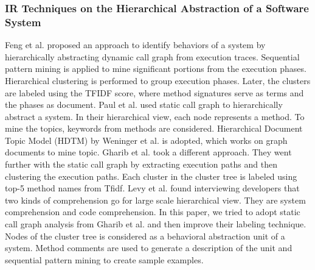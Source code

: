 \subsubsection{IR Techniques on the Hierarchical Abstraction of a Software System}
Feng et al. \cite{feng2018hierarchicalExecutionComprehension} proposed an approach to identify behaviors of a system by hierarchically abstracting dynamic call graph from execution traces. Sequential pattern mining is applied to mine significant portions from the execution phases. Hierarchical clustering is performed to group execution phases. Later, the clusters are labeled using the TFIDF score, where method signatures serve as terms and the phases as document. 
Paul et al. \cite{mcburney2014improvingTopicSummarize} used static call graph to hierarchically abstract a system. In their hierarchical view, each node represents a method. To mine the topics, keywords from methods are considered. Hierarchical Document Topic Model (HDTM) by \cite{weninger2012documentTopicHierarchies} Weninger et al. is adopted, which works on graph documents to mine topic. Gharib et al. \cite{gharibi2018automaticStaticCluster} took a different approach. They went further with the static call graph by extracting execution paths and then clustering the execution paths. Each cluster in the cluster tree is labeled using top-5 method names from Tfidf. Levy et al. \cite{levy2019understandingLargeHierarchical} found interviewing developers that two kinds of comprehension go for large scale hierarchical view. They are system comprehension and code comprehension. In this paper, we tried to adopt static call graph analysis from Gharib et al. and then improve their labeling technique. Nodes of the cluster tree is considered as a behavioral abstraction unit of a system. Method comments are used to generate a description of the unit and sequential pattern mining to create sample examples. 


